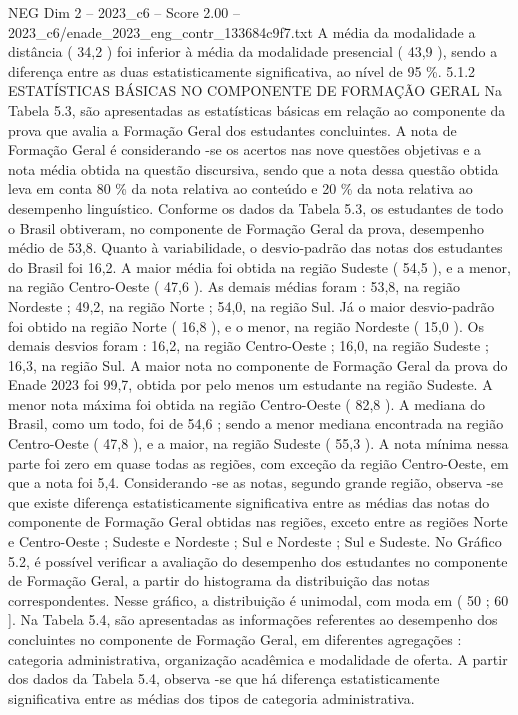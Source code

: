 \begin{textsample}{NEG Dim 2 – 2023\_c6 – Score 2.00 – 2023\_c6/enade\_2023\_eng\_contr\_133684c9f7.txt}
A média da modalidade a distância ( 34,2 ) foi inferior à média da modalidade presencial ( 43,9 ), sendo a diferença entre as duas estatisticamente significativa, ao nível de 95 \%. 5.1.2 ESTATÍSTICAS BÁSICAS NO COMPONENTE DE FORMAÇÃO GERAL Na Tabela 5.3, são apresentadas as estatísticas básicas em relação ao componente da prova que avalia a Formação Geral dos estudantes concluintes.
A nota de Formação Geral é considerando -se os acertos nas nove questões objetivas e a nota média obtida na questão discursiva, sendo que a nota dessa questão obtida leva em conta 80 \% da nota relativa ao conteúdo e 20 \% da nota relativa ao desempenho linguístico.
Conforme os dados da Tabela 5.3, os estudantes de todo o Brasil obtiveram, no componente de Formação Geral da prova, desempenho médio de 53,8.
Quanto à variabilidade, o desvio-padrão das notas dos estudantes do Brasil foi 16,2.
A maior média foi obtida na região Sudeste ( 54,5 ), e a menor, na região Centro-Oeste ( 47,6 ).
As demais médias foram : 53,8, na região Nordeste ; 49,2, na região Norte ; 54,0, na região Sul.
Já o maior desvio-padrão foi obtido na região Norte ( 16,8 ), e o menor, na região Nordeste ( 15,0 ).
Os demais desvios foram : 16,2, na região Centro-Oeste ; 16,0, na região Sudeste ; 16,3, na região Sul.
A maior nota no componente de Formação Geral da prova do Enade 2023 foi 99,7, obtida por pelo menos um estudante na região Sudeste.
A menor nota máxima foi obtida na região Centro-Oeste ( 82,8 ).
A mediana do Brasil, como um todo, foi de 54,6 ; sendo a menor mediana encontrada na região Centro-Oeste ( 47,8 ), e a maior, na região Sudeste ( 55,3 ).
A nota mínima nessa parte foi zero em quase todas as regiões, com exceção da região Centro-Oeste, em que a nota foi 5,4.
Considerando -se as notas, segundo grande região, observa -se que existe diferença estatisticamente significativa entre as médias das notas do componente de Formação Geral obtidas nas regiões, exceto entre as regiões Norte e Centro-Oeste ; Sudeste e Nordeste ; Sul e Nordeste ; Sul e Sudeste.
No Gráfico 5.2, é possível verificar a avaliação do desempenho dos estudantes no componente de Formação Geral, a partir do histograma da distribuição das notas correspondentes.
Nesse gráfico, a distribuição é unimodal, com moda em ( 50 ; 60 ].
Na Tabela 5.4, são apresentadas as informações referentes ao desempenho dos concluintes no componente de Formação Geral, em diferentes agregações : categoria administrativa, organização acadêmica e modalidade de oferta.
A partir dos dados da Tabela 5.4, observa -se que há diferença estatisticamente significativa entre as médias dos tipos de categoria administrativa.

\end{textsample}
